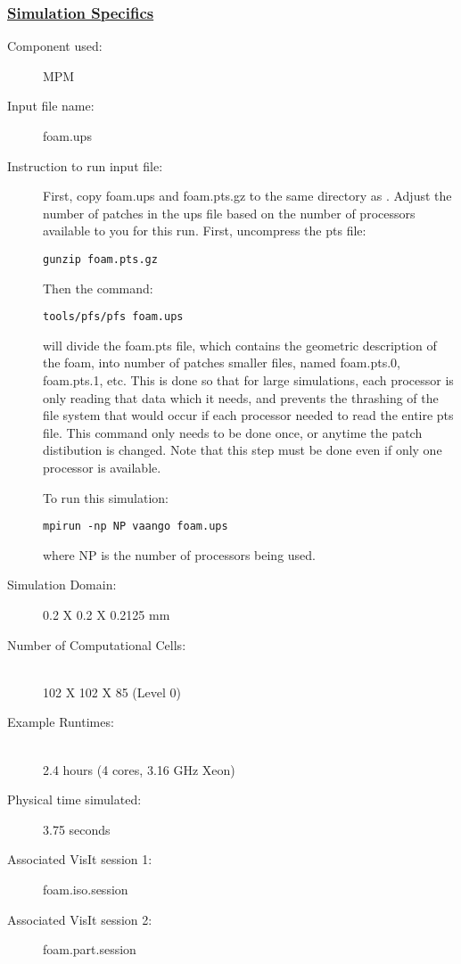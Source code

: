 \subsubsection*{\underline{Simulation Specifics}}
\begin{description} 
\item [Component used:] \hfill MPM
\item [Input file name:] \hfill foam.ups
\item [Instruction to run input file:]

First, copy foam.ups and foam.pts.gz to the same directory as .
Adjust the number of patches in the ups file based on
the number of processors available to you for this run.
First, uncompress the pts file:
\begin{lstlisting}[backgroundcolor=\color{background}]
 gunzip foam.pts.gz
\end{lstlisting}

Then the command:
\begin{lstlisting}[backgroundcolor=\color{background}]
 tools/pfs/pfs foam.ups
\end{lstlisting}
will divide the foam.pts
file, which contains the geometric description of the foam,
into number of patches smaller files, named foam.pts.0,
foam.pts.1, etc.  This is done so that for large simulations,
each processor is only reading that data which it needs, and
prevents the thrashing of the file system that would occur
if each processor needed to read the entire pts file.  This
command only needs to be done once, or anytime the patch
distibution is changed.  Note that this step must be done even
if only one processor is available.

To run this simulation:
\begin{lstlisting}[backgroundcolor=\color{background}]
  mpirun -np NP vaango foam.ups
\end{lstlisting}
where NP is the number of processors being used.

\item [Simulation Domain:]\hfill  0.2 X 0.2 X 0.2125 mm

\item [Number of Computational Cells:]\hfill \\ 
102 X 102 X 85 (Level 0)

\item [Example Runtimes:] \hfill \\
2.4 hours  (4 cores, 3.16 GHz Xeon)\\

\item [Physical time simulated:] \hfill 3.75 seconds

\item [Associated VisIt session 1:] \hfill foam.iso.session
\item [Associated VisIt session 2:] \hfill foam.part.session

\end{description}

